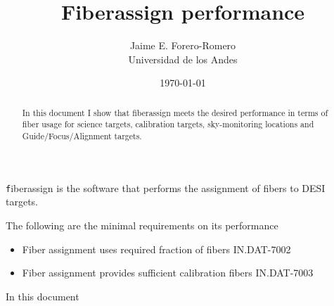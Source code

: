 \documentclass{article}
\title{Fiberassign performance}
\author{Jaime E. Forero-Romero\\Universidad de los Andes}
\date{\today}
\begin{document}
\maketitle
\begin{abstract}
In this document I show that fiberassign meets the desired performance in terms of fiber usage for science targets, calibration targets, sky-monitoring locations and Guide/Focus/Alignment targets.
\end{abstract}

{\texttt fiberassign} is the software that performs the assignment of
fibers to DESI targets. 

The following are the minimal requirements on its performance
\begin{itemize}
\item Fiber assignment uses required fraction of fibers IN.DAT-7002
\item Fiber assignment provides sufficient calibration fibers IN.DAT-7003

\end{itemize}
In this document
\end{document}
